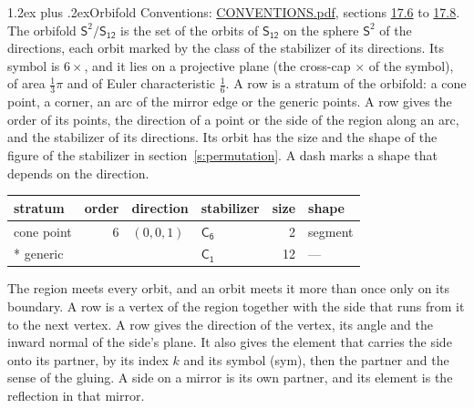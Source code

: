 \documentclass[10pt,a4paper]{article}
\makeatletter
\renewcommand\section{\@startsection{section}{1}{\z@}{-3ex plus -1ex minus -.2ex}%
  {1.2ex plus .2ex}{\normalfont\large\sffamily\bfseries\color{parttitle}}}
\numberwithin{equation}{section}
\newcommand{\grp}[1]{\mathsf{#1}}
\newcommand{\orbname}[1]{#1}
\newcommand{\dirvec}[3]{(#1, #2, #3)}
\newcommand{\twosphere}{\mathsf{S}^{2}}
\makeatother
\begin{document}
\section{Orbifold}\label{s:orbifold}
Conventions: \href{../../CONVENTIONS.pdf}{CONVENTIONS.pdf}, sections \href{../../CONVENTIONS.pdf\#conv.17.6}{17.6} to \href{../../CONVENTIONS.pdf\#conv.17.8}{17.8}.
The orbifold $\twosphere/\grp{S_{12}}$ is the set of the orbits of $\grp{S_{12}}$ on the sphere $\twosphere$ of the directions, each orbit marked by the class of the stabilizer of its directions. Its symbol is $\orbname{6{\times}}$, and it lies on a projective plane (the cross-cap ${\times}$ of the symbol), of area $\tfrac{1}{3}\pi$ and of Euler characteristic $\tfrac{1}{6}$.
\leavevmode\label{n:head.stratum}\label{n:head.order.point}\label{n:head.direction}\label{n:head.stabilizer}\label{n:head.size.orbit}\label{n:head.shape}A row is a stratum of the orbifold: a cone point, a corner, an arc of the mirror edge or the generic points. A row gives the order of its points, the direction of a point or the side of the region along an arc, and the stabilizer of its directions. Its orbit has the size and the shape of the figure of the stabilizer in section~\ref{s:permutation}. A dash marks a shape that depends on the direction.
{\small\setlength{\tabcolsep}{4pt}\begin{longtable}{@{}lrllrl@{}}\toprule
stratum & order & direction & stabilizer & size & shape\\\midrule\endhead
\bottomrule\endfoot\endlastfoot
cone point & 6 & $\dirvec{0}{0}{1}$ & \href{C6.pdf}{$\grp{C_{6}}$} & 2 & segment\\*
generic &  &  & \href{C1.pdf}{$\grp{C_{1}}$} & 12 & ---\\
\bottomrule\end{longtable}}
\leavevmode\label{n:head.vertex.region}\label{n:head.angle}\label{n:head.normal.side}\label{n:head.partner}\label{n:head.sense}The region meets every orbit, and an orbit meets it more than once only on its boundary. A row is a vertex of the region together with the side that runs from it to the next vertex. A row gives the direction of the vertex, its angle and the inward normal of the side's plane. It also gives the element that carries the side onto its partner, by its index $k$ and its symbol (sym), then the partner and the sense of the gluing. A side on a mirror is its own partner, and its element is the reflection in that mirror.
\end{document}
